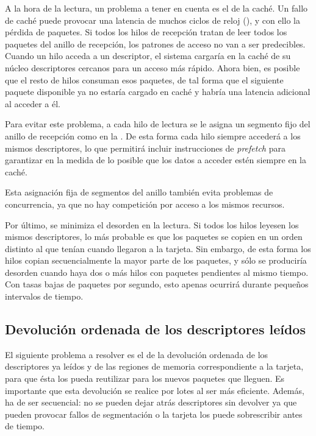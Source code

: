 \documentclass[twoside, 12pt]{epstfg}
\begin{document}
A la hora de la lectura, un problema a tener en cuenta es el de la caché. Un fallo de caché puede provocar una latencia de muchos ciclos de reloj (), y con ello la pérdida de paquetes. Si todos los hilos de recepción tratan de leer todos los paquetes del anillo de recepción, los patrones de acceso no van a ser predecibles. Cuando un hilo acceda a un descriptor, el sistema cargaría en la caché de su núcleo descriptores cercanos para un acceso más rápido. Ahora bien, es posible que el resto de hilos consuman esos paquetes, de tal forma que el siguiente paquete disponible ya no estaría cargado en caché y habría una latencia adicional al acceder a él.

Para evitar este problema, a cada hilo de lectura se le asigna un segmento fijo del anillo de recepción como en la . De esta forma cada hilo siempre accederá a los mismos descriptores, lo que permitirá incluir instrucciones de \textit{prefetch} para garantizar en la medida de lo posible que los datos a acceder estén siempre en la caché.

Esta asignación fija de segmentos del anillo también evita problemas de concurrencia, ya que no hay competición por acceso a los mismos recursos.

Por último, se minimiza el desorden en la lectura. Si todos los hilos leyesen los mismos descriptores, lo más probable es que los paquetes se copien en un orden distinto al que tenían cuando llegaron a la tarjeta. Sin embargo, de esta forma los hilos copian secuencialmente la mayor parte de los paquetes, y sólo se produciría desorden cuando haya dos o más hilos con paquetes pendientes al mismo tiempo. Con tasas bajas de paquetes por segundo, esto apenas ocurrirá durante pequeños intervalos de tiempo.

\subsection{Devolución ordenada de los descriptores leídos}

El siguiente problema a resolver es el de la devolución ordenada de los descriptores ya leídos y de las regiones de memoria correspondiente a la tarjeta, para que ésta los pueda reutilizar para los nuevos paquetes que lleguen. Es importante que esta devolución se realice por lotes al ser más eficiente. Además, ha de ser secuencial: no se pueden dejar atrás descriptores sin devolver ya que pueden provocar fallos de segmentación o la tarjeta los puede sobrescribir antes de tiempo.
\end{document}
